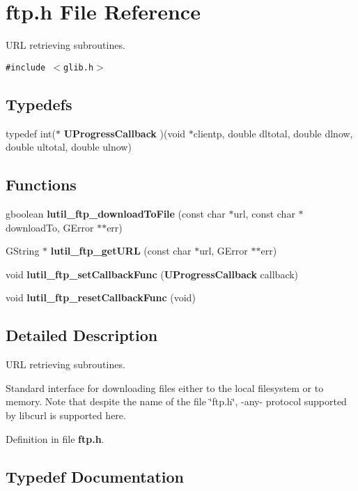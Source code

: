 \section{ftp.h File Reference}
\label{ftp_8h}
URL retrieving subroutines.  


{\tt \#include $<$glib.h$>$}\par
\subsection*{Typedefs}
\begin{CompactItemize}
\item 
typedef int($\ast$ {\bf UProgress\-Callback} )(void $\ast$clientp, double dltotal, double dlnow, double ultotal, double ulnow)
\end{CompactItemize}
\subsection*{Functions}
\begin{CompactItemize}
\item 
gboolean {\bf lutil\_\-ftp\_\-download\-To\-File} (const char $\ast$url, const char $\ast$download\-To, GError $\ast$$\ast$err)
\item 
GString $\ast$ {\bf lutil\_\-ftp\_\-get\-URL} (const char $\ast$url, GError $\ast$$\ast$err)
\item 
void {\bf lutil\_\-ftp\_\-set\-Callback\-Func} ({\bf UProgress\-Callback} callback)
\item 
void {\bf lutil\_\-ftp\_\-reset\-Callback\-Func} (void)
\end{CompactItemize}


\subsection{Detailed Description}
URL retrieving subroutines. 

Standard interface for downloading files either to the local filesystem or to memory. Note that despite the name of the file \char`\"{}ftp.h\char`\"{}, -any- protocol supported by libcurl is supported here.

Definition in file {\bf ftp.h}.

\subsection{Typedef Documentation}
